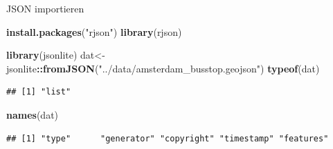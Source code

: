 \documentclass[ignorenonframetext,]{beamer}
\newenvironment{Shaded}{\begin{snugshade}}{\end{snugshade}}
\newcommand{\KeywordTok}[1]{\textcolor[rgb]{0.13,0.29,0.53}{\textbf{#1}}}
\newcommand{\NormalTok}[1]{#1}
\newcommand{\OperatorTok}[1]{\textcolor[rgb]{0.81,0.36,0.00}{\textbf{#1}}}
\newcommand{\StringTok}[1]{\textcolor[rgb]{0.31,0.60,0.02}{#1}}
\begin{document}
\begin{frame}[fragile]{JSON importieren}
\protect\hypertarget{json-importieren}{}

\begin{Shaded}
\begin{Highlighting}[]
\KeywordTok{install.packages}\NormalTok{(}\StringTok{"rjson"}\NormalTok{)}
\KeywordTok{library}\NormalTok{(rjson)}
\end{Highlighting}
\end{Shaded}

\begin{Shaded}
\begin{Highlighting}[]
\KeywordTok{library}\NormalTok{(jsonlite)}
\NormalTok{dat<-jsonlite}\OperatorTok{::}\KeywordTok{fromJSON}\NormalTok{(}\StringTok{"../data/amsterdam_busstop.geojson"}\NormalTok{)}
\KeywordTok{typeof}\NormalTok{(dat)}
\end{Highlighting}
\end{Shaded}

\begin{verbatim}
## [1] "list"
\end{verbatim}

\begin{Shaded}
\begin{Highlighting}[]
\KeywordTok{names}\NormalTok{(dat)}
\end{Highlighting}
\end{Shaded}

\begin{verbatim}
## [1] "type"      "generator" "copyright" "timestamp" "features"
\end{verbatim}

\end{frame}
\end{document}
